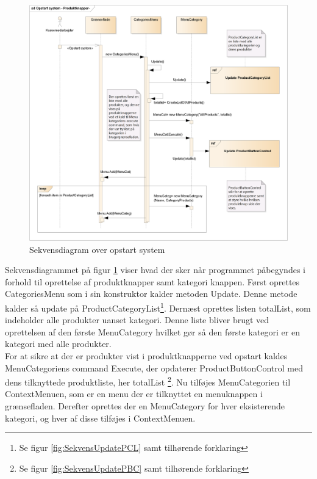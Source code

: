 \begin{figure}[H]
	\centering
	\includegraphics[width=1\textwidth]{Systemdesign/Frontend/GUI/DesignOgStruktur/Pics/OpstartSystem2}
	\caption{Sekvensdiagram over opstart system}
	\label{fig:SekvensOpstart}
\end{figure}

Sekvensdiagrammet på figur \ref{fig:SekvensOpstart} viser hvad der sker når programmet påbegyndes i forhold til oprettelse af produktknapper samt kategori knappen. Først oprettes CategoriesMenu som i sin konstruktor kalder metoden Update. Denne metode kalder så update på ProductCategoryList\footnote{Se figur \ref{fig:SekvensUpdatePCL} samt tilhørende forklaring}. Dernæst oprettes listen totalList, som indeholder alle produkter uanset kategori. Denne liste bliver brugt ved oprettelsen af den første MenuCategory hvilket gør så den første kategori er en kategori med alle produkter. \\
For at sikre at der er produkter vist i produktknapperne ved opstart kaldes MenuCategoriens command Execute, der opdaterer ProductButtonControl med dens tilknyttede produktliste, her totalList \footnote{Se figur \ref{fig:SekvensUpdatePBC} samt tilhørende forklaring}. Nu tilføjes MenuCategorien til ContextMenuen, som er en menu der er tilknyttet en menuknappen i grænsefladen. Derefter oprettes der en MenuCategory for hver eksisterende kategori, og hver af disse tilføjes i ContextMenuen.

